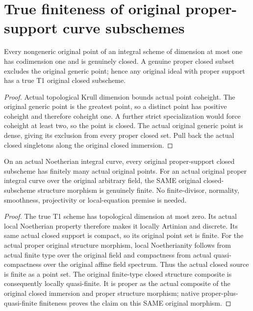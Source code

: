 \section{True finiteness of original proper-support curve subschemes}

\begin{theorem}
\label{thm:fc-curve-proper-support-points}
\leanok
{}
Every nongeneric original point of an integral scheme of dimension at most
one has codimension one and is genuinely closed. A genuine proper closed
subset excludes the original generic point; hence any original ideal with
proper support has a true T1 original closed subscheme.
\end{theorem}
\begin{proof}
Actual topological Krull dimension bounds actual point coheight. The original
generic point is the greatest point, so a distinct point has positive
coheight and therefore coheight one. A further strict specialization would
force coheight at least two, so the point is closed. The actual original
generic point is dense, giving its exclusion from every proper closed set.
Pull back the actual closed singletons along the original closed immersion.
\end{proof}

\begin{theorem}
\label{thm:fc-curve-finite-closed-subschemes}
\leanok
{}
On an actual Noetherian integral curve, every original proper-support closed
subscheme has finitely many actual original points. For an actual original
proper integral curve over the original arbitrary field, the SAME original
closed-subscheme structure morphism is genuinely finite. No finite-divisor,
normality, smoothness, projectivity or local-equation premise is needed.
\end{theorem}
\begin{proof}
The true T1 scheme has topological dimension at most zero. Its actual local
Noetherian property therefore makes it locally Artinian and discrete. Its
same actual closed support is compact, so its original point set is finite.
For the actual proper original structure morphism, local Noetherianity
follows from actual finite type over the original field and compactness from
actual quasi-compactness over the original affine field spectrum. Thus the
actual closed source is finite as a point set. The original finite-type
closed structure composite is consequently locally quasi-finite. It is
proper as the actual composite of the original closed immersion and proper
structure morphism; native proper-plus-quasi-finite finiteness proves the
claim on this SAME original morphism.
\end{proof}
